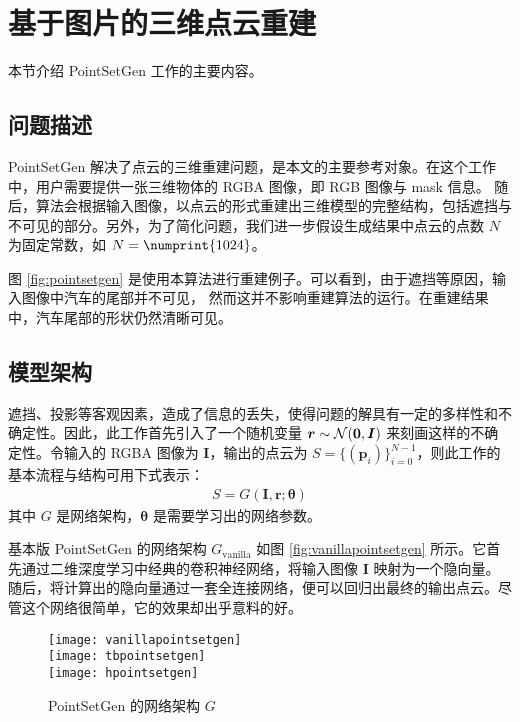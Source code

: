 \section{基于图片的三维点云重建 \label{section:pointsetgen}}
本节介绍 PointSetGen\cite{pointsetgen} 工作的主要内容。
\subsection{问题描述}
PointSetGen
解决了点云的三维重建问题，是本文的主要参考对象。在这个工作中，用户需要提供一张三维物体的 RGBA 图像，即 RGB 图像与 mask 信息。 随后，算法会根据输入图像，以点云的形式重建出三维模型的完整结构，包括遮挡与不可见的部分。另外，为了简化问题，我们进一步假设生成结果中点云的点数 $N$ 为固定常数，如 $N =  \numprint{1024}$。

图 \ref{fig:pointsetgen} 是使用本算法进行重建例子。可以看到，由于遮挡等原因，输入图像中汽车的尾部并不可见，
然而这并不影响重建算法的运行。在重建结果中，汽车尾部的形状仍然清晰可见。

\subsection{模型架构}
遮挡、投影等客观因素，造成了信息的丢失，使得问题的解具有一定的多样性和不确定性。因此，此工作首先引入了一个随机变量 $\bm r \sim \mathcal{N}(\bm 0, \bm I)$ 来刻画这样的不确定性。令输入的 RGBA 图像为 $\bm I$，输出的点云为 $S = \{(\bm p_i)\}_{i=0}^{N - 1}$，则此工作的基本流程与结构可用下式表示：
\begin{align}
	S = G(\bm I, \bm r; \bm  \theta)
\end{align}
其中 $G$ 是网络架构，$ \bm \theta$ 是需要学习出的网络参数。

基本版 PointSetGen 的网络架构 $G_{\text{vanilla}}$ 如图 \ref{fig:vanillapointsetgen} 所示。它首先通过二维深度学习中经典的卷积神经网络，将输入图像 $\bm I$ 映射为一个隐向量。随后，将计算出的隐向量通过一套全连接网络，便可以回归出最终的输出点云。尽管这个网络很简单，它的效果却出乎意料的好。
\begin{figure}[h]
	\centering%
	{\texttt{[image: vanillapointsetgen]}}
	\\

	{\texttt{[image: tbpointsetgen]}}
	\\

	{\texttt{[image: hpointsetgen]}}
	\\

	\caption{PointSetGen\cite{pointsetgen} 的网络架构 $G$}
\end{figure}


